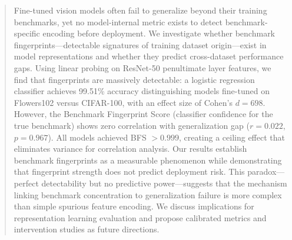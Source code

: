 \begin{abstract}
Fine-tuned vision models often fail to generalize beyond their training benchmarks, yet no model-internal metric exists to detect benchmark-specific encoding before deployment. We investigate whether benchmark fingerprints---detectable signatures of training dataset origin---exist in model representations and whether they predict cross-dataset performance gaps. Using linear probing on ResNet-50 penultimate layer features, we find that fingerprints are massively detectable: a logistic regression classifier achieves 99.51\% accuracy distinguishing models fine-tuned on Flowers102 versus CIFAR-100, with an effect size of Cohen's $d = 698$. However, the Benchmark Fingerprint Score (classifier confidence for the true benchmark) shows zero correlation with generalization gap ($r = 0.022$, $p = 0.967$). All models achieved BFS $> 0.999$, creating a ceiling effect that eliminates variance for correlation analysis. Our results establish benchmark fingerprints as a measurable phenomenon while demonstrating that fingerprint strength does not predict deployment risk. This paradox---perfect detectability but no predictive power---suggests that the mechanism linking benchmark concentration to generalization failure is more complex than simple spurious feature encoding. We discuss implications for representation learning evaluation and propose calibrated metrics and intervention studies as future directions.
\end{abstract}
